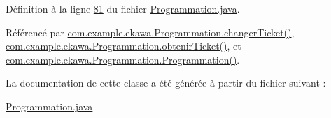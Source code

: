 Définition à la ligne \hyperlink{_programmation_8java_source_l00081}{81} du fichier \hyperlink{_programmation_8java_source}{Programmation.\+java}.



Référencé par \hyperlink{_programmation_8java_source_l00178}{com.\+example.\+ekawa.\+Programmation.\+changer\+Ticket()}, \hyperlink{_programmation_8java_source_l00169}{com.\+example.\+ekawa.\+Programmation.\+obtenir\+Ticket()}, et \hyperlink{_programmation_8java_source_l00110}{com.\+example.\+ekawa.\+Programmation.\+Programmation()}.



La documentation de cette classe a été générée à partir du fichier suivant \+:\begin{DoxyCompactItemize}
\item 
\hyperlink{_programmation_8java}{Programmation.\+java}\end{DoxyCompactItemize}
